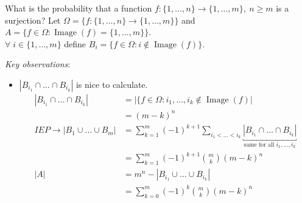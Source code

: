 \begin{example}[Surjections]
    What is the probability that a function $f: \{1,\dots, n\} \to \{1,\dots,m\},\ n \geq m$ is a surjection?
    Let $\Omega = \{f: \{1,\dots,n\} \to \{1,\dots,m\}\}$ and $A = \{f \in \Omega: \operatorname{Image}(f) = \{1, \dots, m\}\}$.\\
    $\forall \; i \in \{1,\dots,m\}$ define $B_i = \{f \in \Omega: i\not \in \operatorname{Image}(f)\}$.

    \emph{Key observations}:
    \begin{itemize}
        \mathitem \begin{align*}
            A &= B_1^c \cap \dots B_m^c \\
            &= (B_1 \cup \dots \cup B_m)^c
        \end{align*} 
        \item $|B_{i_1} \cap \dots \cap B_{i_k}|$ is nice to calculate.
        \begin{align*}
            |B_{i_1} \cap \dots \cap B_{i_k}| &= | \{ f \in \Omega : i_1, \dots, i_k \notin \operatorname{Image}(f) | \\
            &= (m - k)^n \\
            IEP \to |B_1 \cup \dots \cup B_m| &= \sum_{k=1}^{m} (-1)^{k + 1} \sum_{i_1 < \dots < i_k} \underbracket{|B_{i_1} \cap \dots \cap B_{i_k}|}_\text{same for all $i_1, \dots, i_k$}\\
            &= \sum_{k=1}^{m} (-1)^{k+1} \binom{m}{k} (m - k)^n \\
            |A| &= m^n - |B_{i_1} \cup \dots \cup B_{i_k}| \\
            &= \sum_{k=0}^m (-1)^k \binom{m}{k} (m - k)^n 
        \end{align*} 
    \end{itemize}
\end{example} 

